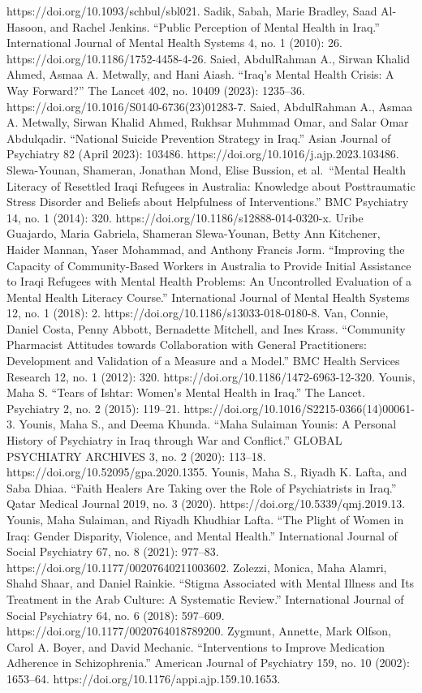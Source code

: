 https://doi.org/10.1093/schbul/sbl021. Sadik, Sabah, Marie Bradley, Saad
Al-Hasoon, and Rachel Jenkins. ``Public Perception of Mental Health in
Iraq.'' International Journal of Mental Health Systems 4, no. 1 (2010):
26. https://doi.org/10.1186/1752-4458-4-26. Saied, AbdulRahman A.,
Sirwan Khalid Ahmed, Asmaa A. Metwally, and Hani Aiash. ``Iraq's Mental
Health Crisis: A Way Forward?'' The Lancet 402, no. 10409 (2023):
1235--36. https://doi.org/10.1016/S0140-6736(23)01283-7. Saied,
AbdulRahman A., Asmaa A. Metwally, Sirwan Khalid Ahmed, Rukhsar Muhmmad
Omar, and Salar Omar Abdulqadir. ``National Suicide Prevention Strategy
in Iraq.'' Asian Journal of Psychiatry 82 (April 2023): 103486.
https://doi.org/10.1016/j.ajp.2023.103486. Slewa-Younan, Shameran,
Jonathan Mond, Elise Bussion, et al.~``Mental Health Literacy of
Resettled Iraqi Refugees in Australia: Knowledge about Posttraumatic
Stress Disorder and Beliefs about Helpfulness of Interventions.'' BMC
Psychiatry 14, no. 1 (2014): 320.
https://doi.org/10.1186/s12888-014-0320-x. Uribe Guajardo, Maria
Gabriela, Shameran Slewa-Younan, Betty Ann Kitchener, Haider Mannan,
Yaser Mohammad, and Anthony Francis Jorm. ``Improving the Capacity of
Community-Based Workers in Australia to Provide Initial Assistance to
Iraqi Refugees with Mental Health Problems: An Uncontrolled Evaluation
of a Mental Health Literacy Course.'' International Journal of Mental
Health Systems 12, no. 1 (2018): 2.
https://doi.org/10.1186/s13033-018-0180-8. Van, Connie, Daniel Costa,
Penny Abbott, Bernadette Mitchell, and Ines Krass. ``Community
Pharmacist Attitudes towards Collaboration with General Practitioners:
Development and Validation of a Measure and a Model.'' BMC Health
Services Research 12, no. 1 (2012): 320.
https://doi.org/10.1186/1472-6963-12-320. Younis, Maha S. ``Tears of
Ishtar: Women's Mental Health in Iraq.'' The Lancet. Psychiatry 2, no. 2
(2015): 119--21. https://doi.org/10.1016/S2215-0366(14)00061-3. Younis,
Maha S., and Deema Khunda. ``Maha Sulaiman Younis: A Personal History of
Psychiatry in Iraq through War and Conflict.'' GLOBAL PSYCHIATRY
ARCHIVES 3, no. 2 (2020): 113--18.
https://doi.org/10.52095/gpa.2020.1355. Younis, Maha S., Riyadh K.
Lafta, and Saba Dhiaa. ``Faith Healers Are Taking over the Role of
Psychiatrists in Iraq.'' Qatar Medical Journal 2019, no. 3 (2020).
https://doi.org/10.5339/qmj.2019.13. Younis, Maha Sulaiman, and Riyadh
Khudhiar Lafta. ``The Plight of Women in Iraq: Gender Disparity,
Violence, and Mental Health.'' International Journal of Social
Psychiatry 67, no. 8 (2021): 977--83.
https://doi.org/10.1177/00207640211003602. Zolezzi, Monica, Maha Alamri,
Shahd Shaar, and Daniel Rainkie. ``Stigma Associated with Mental Illness
and Its Treatment in the Arab Culture: A Systematic Review.''
International Journal of Social Psychiatry 64, no. 6 (2018): 597--609.
https://doi.org/10.1177/0020764018789200. Zygmunt, Annette, Mark Olfson,
Carol A. Boyer, and David Mechanic. ``Interventions to Improve
Medication Adherence in Schizophrenia.'' American Journal of Psychiatry
159, no. 10 (2002): 1653--64.
https://doi.org/10.1176/appi.ajp.159.10.1653.
